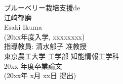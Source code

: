 \documentclass[report,10.5pt,oneside,openany,a4paper]{jsbook}
\begin{document}

\begin{titlepage}
  \begin{center}
  \vspace*{50truept}
  {\Huge ブルーベリー栽培支援de}\\ %
  \vspace{10truept}
  \vspace{20truept}
  {\Huge  江﨑郁磨\ }\\ %
  \vspace{10truept}
  {\Large Esaki Ikuma}\\ %
  \vspace{20truept}
  {\normalsize (20xx年度入学, xxxxxxxx)}\\ %
  \vspace{40truept}
  \vspace{40truept}
  {\huge 指導教員: 清水郁子 准教授 \ }\\ %
  \vspace{10truept}
  {\normalsize 東京農工大学 工学部 知能情報工学科}\\
  \vspace{10truept}
  {\normalsize 20xx 年度卒業論文}\\
  \vspace{10truept}
  {\normalsize (20xx年 x月 xx日 提出)}\\ %
  \end{center}
\end{titlepage}

\begin{titlepage}
  
\end{titlepage}

\frontmatter

\tableofcontents
\listoffigures
\listoftables


\mainmatter







\appendix





\newpage
\printindex
\end{document}
